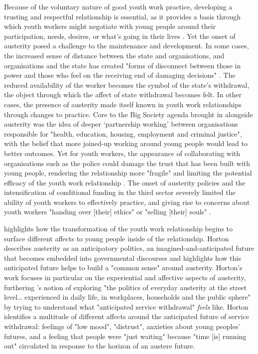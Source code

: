 Because of the voluntary nature of good youth work practice, developing a  trusting and respectful relationship is essential, as it provides a basis through which youth workers might negotiate with young people around their participation, needs, desires, or what's going in their lives \citep[pp. 61–62]{mason_austerity_2015}. Yet the onset of austerity posed a challenge to the maintenance and development. In some cases, the increased sense of distance between the state and organisations, and organisations and the state has created "forms of disconnect between those in power and those who feel on the receiving end of damaging decisions" \citep[p. 737]{clayton_distancing_2016}. The reduced availability of the worker becomes the symbol of the state's withdrawal, the object through which the affect of state withdrawal becomes felt. In other cases, the presence of austerity made itself known in youth work relationships through changes to practice. Core to the Big Society agenda brought in alongside austerity was the idea of deeper `partnership working' between organisations responsible for "health, education, housing, employment and criminal justice", with the belief that more joined-up working around young people would lead to better outcomes. Yet for youth workers, the appearance of collaborating with organisations such as the police could damage the trust that has been built with young people, rendering the relationship more "fragile" and limiting the potential efficacy of the youth work relationship \citep[p. 65]{mason_austerity_2015}. The onset of austerity policies and the intensification of conditional funding in the third sector severely limited the ability of youth workers to effectively practice, and giving rise to concerns about youth workers "handing over [their] ethics" or "selling [their] souls" \citep[p. 374]{pope_handing_2016}.

\citet{horton_anticipating_2016} highlights how the transformation of the youth work relationship begins to surface different affects to young people inside of the relationship. Horton describes austerity as an anticipatory politics, an imagined-and-anticipated future that becomes embedded into governmental discourses and highlights how this anticipated future helps to build a "common sense" around austerity. Horton's work focuses in particular on the experiential and affective aspects of austerity, furthering \citet[p. 632]{peck_austerity_2012}'s notion of exploring "the politics of everyday austerity at the street level\ldots{} experienced in daily life, in workplaces, households and the public sphere" by trying to understand what "anticipated service withdrawal" \emph{feels} like. Horton identifies a multitude of different affects around the anticipated future of service withdrawal: feelings of "low mood", "distrust", anxieties about young peoples' futures, and a feeling that people were "just waiting" because "time [is] running out" circulated in response to the horizon of an austere future. 

